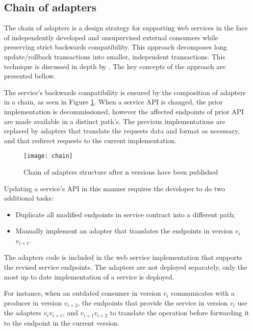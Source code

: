 \subsection{Chain of adapters} %
\label{sec:chain_of_adapters}

The chain of adapters is a design strategy for supporting web services in the face of independently developed and unsupervised external consumers while preserving strict backwards compatibility.
This approach decomposes long update/rollback transactions into smaller, independent transactions.
This technique is discussed in depth by \citeauthor{13} \cite{13}.
The key concepts of the approach are presented bellow.

The service's backwards compatibility is ensured by the composition of adapters in a chain, as seen in Figure \ref{fig:chain}.
When a service API is changed, the prior implementation is decommissioned, however the affected endpoints of prior API are made available in a distinct path's.
The previous implementations are replaced by adapters that translate the requests data and format as necessary, and that redirect requests to the current implementation.

\begin{figure}[htbp]
    \centering
    \texttt{[image: chain]}
    \caption{Chain of adapters structure
    after n versions have been published }
    \label{fig:chain}
\end{figure}

Updating a service's API in this manner requires the developer to do two additional tasks:
\begin{itemize}
    \setlength\itemsep{0em}
    \item Duplicate all modified endpoints in service contract into a different path;
    \item Manually implement an adapter that translates the endpoints in version $v_i$\textrightarrow$v_{i+1}$.
\end{itemize}
The adapters code is included in the web service implementation that supports the revised service endpoints.
The adapters are not deployed separately, only the most up to date implementation of a service is deployed.

For instance, when an outdated consumer in version $v_i$ communicates with a producer in version $v_{i+2}$, the endpoints that provide the service
in version $v_i$ use the adapters $v_i$\textrightarrow$v_{i+1}$, and $v_{i+1}$\textrightarrow$v_{i+2}$ to translate the operation before forwarding it to the endpoint in the current version.

